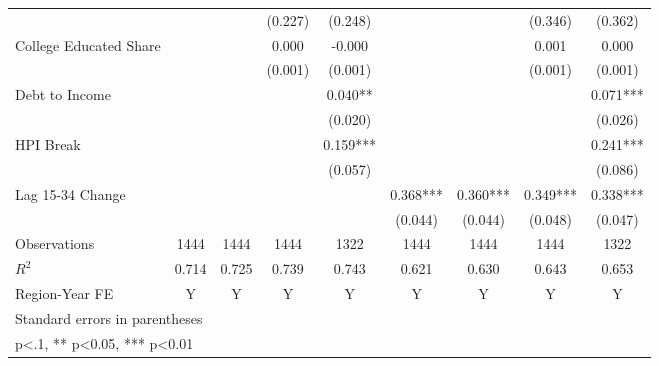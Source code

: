 \begin{table}[htbp]
\begin{tabular}{l*{8}{c}}
                    &            &            &  (0.227)   &  (0.248)   &            &            &  (0.346)   &  (0.362)   \\
\addlinespace
College Educated Share&            &            &    0.000   &   -0.000   &            &            &    0.001   &    0.000   \\
                    &            &            &  (0.001)   &  (0.001)   &            &            &  (0.001)   &  (0.001)   \\
\addlinespace
Debt to Income      &            &            &            &    0.040** &            &            &            &    0.071***\\
                    &            &            &            &  (0.020)   &            &            &            &  (0.026)   \\
\addlinespace
HPI Break           &            &            &            &    0.159***&            &            &            &    0.241***\\
                    &            &            &            &  (0.057)   &            &            &            &  (0.086)   \\
\addlinespace
Lag 15-34 Change    &            &            &            &            &    0.368***&    0.360***&    0.349***&    0.338***\\
                    &            &            &            &            &  (0.044)   &  (0.044)   &  (0.048)   &  (0.047)   \\
\midrule
Observations        &     1444   &     1444   &     1444   &     1322   &     1444   &     1444   &     1444   &     1322   \\
\(R^{2}\)           &    0.714   &    0.725   &    0.739   &    0.743   &    0.621   &    0.630   &    0.643   &    0.653   \\
Region-Year FE      &        Y   &        Y   &        Y   &        Y   &        Y   &        Y   &        Y   &        Y   \\
\bottomrule
\multicolumn{9}{l}{\footnotesize Standard errors in parentheses}\\
\multicolumn{9}{l}{\footnotesize * p<.1, ** p<0.05, *** p<0.01}\\
\end{tabular}
\end{table}
